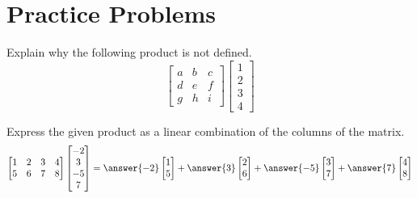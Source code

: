 \documentclass{ximera}
\begin{document}
\section*{Practice Problems}

\begin{problem}\label{prob:matprodundefined} Explain why the following product is not defined.
$$\begin{bmatrix}a&b&c\\d&e&f\\g&h&i\end{bmatrix}\begin{bmatrix}1\\2\\3\\4\end{bmatrix}$$
\end{problem}

\begin{problem}\label{prob:lincombcols}
Express the given product as a linear combination of the columns of the matrix.
$$\begin{bmatrix}1&2&3&4\\5&6&7&8\end{bmatrix}\begin{bmatrix}-2\\3\\-5\\7\end{bmatrix}=\answer{-2}\begin{bmatrix}1\\5\end{bmatrix}+\answer{3}\begin{bmatrix}2\\6\end{bmatrix}+\answer{-5}\begin{bmatrix}3\\7\end{bmatrix}+\answer{7}\begin{bmatrix}4\\8\end{bmatrix}$$
\end{problem}
\end{document}
